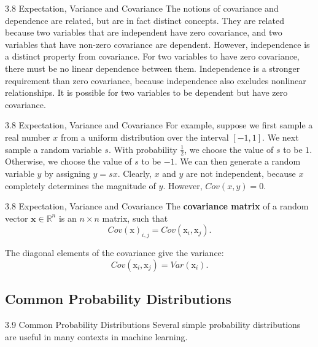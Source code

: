 \begin{frame}{3.8 Expectation, Variance and Covariance}
    \justifying
    The notions of covariance and dependence are related, but are in fact distinct concepts. They are related because two variables that are independent have zero covariance, and two variables that have non-zero covariance are dependent. However, independence is a distinct property from covariance. For two variables to have zero covariance, there must be no linear dependence between them. Independence is a stronger requirement than zero covariance, because independence also excludes nonlinear relationships. It is possible for two variables to be dependent but have zero covariance.
\end{frame}

\begin{frame}{3.8 Expectation, Variance and Covariance}
    \justifying
    For example, suppose we first sample a real number $x$ from a uniform distribution over the interval $[-1, 1]$. We next sample a random variable $s$. With probability $\frac{1}{2}$, we choose the value of $s$ to be $1$. Otherwise, we choose the value of $s$ to be $-1$. We can then generate a random variable $y$ by assigning $y = sx$. Clearly, $x$ and $y$ are not independent, because $x$ completely determines the magnitude of $y$. However, $Cov(x, y) = 0$.
\end{frame}

\begin{frame}{3.8 Expectation, Variance and Covariance}
    \justifying    
    The \textbf{covariance matrix} of a random vector $\boldsymbol{x} \in \mathbb{R}^{n}$ is an $n \times n$ matrix, such that
    \begin{equation}
        Cov(\boldsymbol{\mathrm{x}})_{i, j} = Cov(\mathrm{x}_{i}, \mathrm{x}_{j}).
        \label{eq:3_14}
    \end{equation}
    
    The diagonal elements of the covariance give the variance:
    \begin{equation}
        Cov(\mathrm{x}_{i}, \mathrm{x}_{j}) = Var(\mathrm{x}_{i}).
        \label{eq:3_15}
    \end{equation}{}
\end{frame}


\subsection{Common Probability Distributions}
\begin{frame}{3.9 Common Probability Distributions}
    \justifying
    Several simple probability distributions are useful in many contexts in machine learning.
\end{frame}

